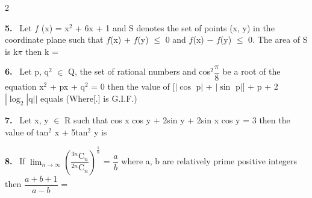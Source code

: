 \documentclass[10pt]{extarticle}
\newcommand{\qn}[1]{\par\smallskip\noindent\textbf{#1.}~}
\begin{document}
\begin{multicols}{2}
\qn{5} Let $f$ (x) = x$^2$ + 6x + 1 and S denotes the set of points (x, y) in the coordinate plane such that $f$(x) + $f$(y) $\leq$ 0 and $f$(x) $-$ $f$(y) $\leq$ 0. The area of S is k$\pi$ then k =
\qn{6} Let p, q$^2$ $\in$ Q, the set of rational numbers and cos$^2\dfrac{\pi}{8}$ be a root of the equation x$^2$ + px + q$^2$ = 0 then the value of [$|\cos$ p$|$ + $|\sin$ p$|$] + p + 2 $|\log_2|\text{q}||$ equals (Where[.] is G.I.F.)
\qn{7} Let x, y $\in$ R such that cos x cos y + 2sin y + 2sin x cos y = 3 then the value of tan$^2$ x + 5tan$^2$ y is
\qn{8} If $\displaystyle\lim_{n\to\infty}\left(\dfrac{{}^{3n}\text{C}_n}{{}^{2n}\text{C}_n}\right)^{\frac{1}{n}}$ = $\dfrac{a}{b}$ where a, b are relatively prime positive integers then $\dfrac{a+b+1}{a-b}$ =
\end{multicols}
\end{document}
